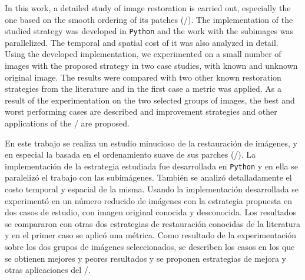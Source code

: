 \begin{eabstract}

In this work, a detailed study of image restoration is carried out, especially the one based on the smooth ordering of its patches (\SOP/). The implementation of the studied strategy was developed in \texttt{Python} and the work with the subimages was parallelized. The temporal and spatial cost of it was also analyzed in detail. Using the developed implementation, we experimented on a small number of images with the proposed strategy in two case studies, with known and unknown original image. The results were compared with two other known restoration strategies from the literature and in the first case a metric was applied. As a result of the experimentation on the two selected groups of images, the best and worst performing cases are described and improvement strategies and other applications of the \SOP/ are proposed.

\qquad


\end{eabstract}

\begin{sabstract}

En este trabajo se realiza un estudio minucioso de la restauración de imágenes, y en especial la basada en el ordenamiento suave de sus parches (\SOP/). La implementación de la estrategia estudiada fue desarrollada en \texttt{Python} y en ella se paralelizó el trabajo con las subimágenes. También se analizó detalladamente el costo temporal y espacial de la misma. Usando la implementación desarrollada se experimentó en un número reducido de imágenes con la estrategia propuesta en dos casos de estudio, con imagen original conocida y desconocida. Los resultados se compararon con otras dos estrategias de restauración conocidas de la literatura y en el primer caso se aplicó una métrica. Como resultado de la experimentación sobre los dos grupos de imágenes seleccionados, se describen los casos en los que se obtienen mejores y peores resultados y se proponen estrategias de mejora y otras aplicaciones del \SOP/.

\qquad


\end{sabstract}